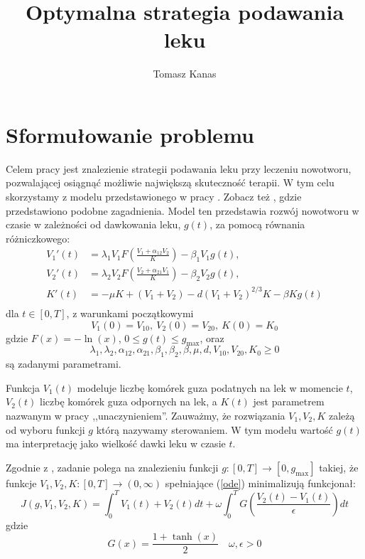 \documentclass[11pt]{article}
\title{Optymalna strategia podawania leku}
\author{Tomasz Kanas}
\begin{document}
\maketitle

\section{Sformułowanie problemu}
Celem pracy jest znalezienie strategii podawania leku przy leczeniu nowotworu, pozwalającej osiągnąć możliwie największą skuteczność terapii. W tym celu skorzystamy z modelu przedstawionego w pracy \cite{BBF-manuscript}. Zobacz też \cite{BBF2016}, \cite{BBF2019} gdzie przedstawiono podobne zagadnienia. Model ten przedstawia rozwój nowotworu w czasie w zależności od dawkowania leku, $g(t)$, za pomocą równania różniczkowego:
\begin{equation} \label{ode}
  \begin{aligned} 
    V_1'(t) &= \lambda_1V_1F\left(\frac{V_1 + \alpha_{12}V_2}{K}\right) - \beta_1V_1g(t), \\
    V_2'(t) &= \lambda_2V_2F\left(\frac{V_2 + \alpha_{21}V_1}{K}\right) - \beta_2V_2g(t), \\
    K'(t) &= -\mu K + (V_1+V_2) - d{(V_1 + V_2)}^{2/3}K - \beta K g(t) \\
  \end{aligned}
\end{equation}
dla $t \in [0, T]$, z warunkami początkowymi
\begin{equation} \label{ode-start}
   V_1(0) = V_{10},\ V_2(0) = V_{20},\ K(0) = K_0
\end{equation}
gdzie $F(x) = -\ln(x)$, $ 0 \le g(t) \le g_{\max}$, oraz
\[\lambda_1, \lambda_2, \alpha_{12}, \alpha_{21}, \beta_1, \beta_2, \beta, \mu, d, V_{10}, V_{20}, K_0 \ge 0\]
są zadanymi parametrami.

Funkcja $V_1(t)$ modeluje liczbę komórek guza podatnych na lek w momencie $t$, $V_2(t)$ liczbę komórek guza odpornych na lek, a $K(t)$ jest parametrem nazwanym w pracy ,,unaczynieniem''. Zauważmy, że rozwiązania $V_1, V_2, K$ zależą od wyboru funkcji $g$ którą nazywamy sterowaniem. W tym modelu wartość $g(t)$ ma interpretację jako wielkość dawki leku w czasie $t$.

Zgodnie z \cite{BBF-manuscript}, zadanie polega na znalezieniu funkcji $g: [0, T] \to [0, g_{\max}]$ takiej, że funkcje $V_1, V_2, K: [0, T] \to (0, \infty)$ spełniające (\ref{ode}) minimalizują funkcjonał:
\begin{equation} \label{objf}
  J(g, V_1, V_2, K) = \int_0^T V_1(t) + V_2(t)dt + \omega\int_0^T G\left(\frac{V_2(t) - V_1(t)}{\epsilon}\right) dt
\end{equation}
gdzie
\begin{equation*}
  G(x) = \frac{1+\tanh(x)}{2} \quad
  \omega, \epsilon > 0 
\end{equation*}
\end{document}
